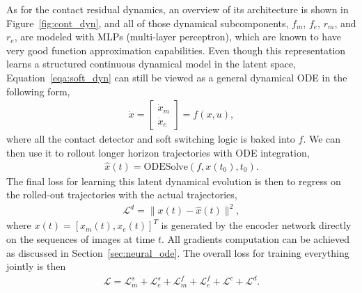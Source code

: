 \documentclass[conference]{IEEEtran}
\begin{document}
As for the contact residual dynamics, an overview of its architecture is shown in
Figure~\ref{fig:cont_dyn}, and all of those dynamical subcomponents, $f_m$, $f_e$,
$r_m$, and $r_e$, are modeled with MLPs (multi-layer perceptron), which are known
to have very good function approximation capabilities.
Even though this representation learns a structured
continuous dynamical model in the latent space, Equation~\ref{eqa:soft_dyn} can
still be viewed as a general dynamical ODE in the following form,
\begin{gather}\label{eqa:joint_dynamics}
  \dot{x} = \begin{bmatrix}\dot{x}_m \\ \dot{x}_e\end{bmatrix} = f(x, u),
\end{gather}
where all the contact detector and soft switching logic is baked into $f$.
We can then use it to rollout longer horizon trajectories with ODE integration,
\begin{gather}
  \hat{x}(t) = \text{ODESolve}(f, x(t_0), t_0).
\end{gather}
The final loss for learning this latent dynamical evolution is then to regress
on the rolled-out trajectories with the actual trajectories,
\begin{gather}
  \mathcal{L}^d = \|x(t) - \hat{x}(t)\|^2,
\end{gather}
where $x(t) = [x_m(t), x_e(t)]^T$ is generated by the encoder network directly
on the sequences of images at time $t$.
All gradients computation can be achieved as discussed in
Section~\ref{sec:neural_ode}.
The overall loss for training everything jointly is then
\begin{gather}
  \mathcal{L} = \mathcal{L}_m^s + \mathcal{L}_e^s + \mathcal{L}_m^f + \mathcal{L}_e^f +
                \mathcal{L}^c + \mathcal{L}^d.
\end{gather}
\end{document}
